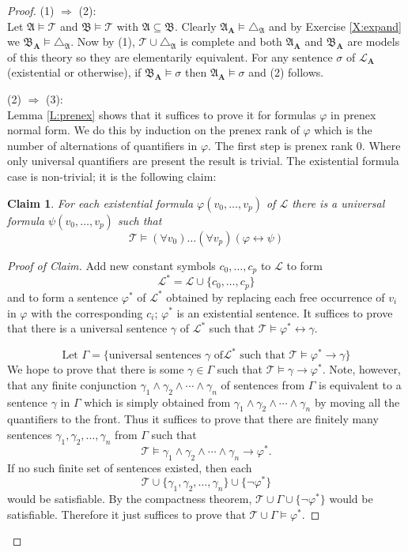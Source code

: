 \documentclass[titlepage, oneside]{amsbook}
\theoremstyle{plain}
\newtheorem*{claim}{Claim}
\theoremstyle{definition}
\theoremstyle{remark}
\newcommand{\tria}[1]{\ensuremath{\triangle_{\mathfrak{#1}}}}
\newcommand{\theory}{\ensuremath{\mathcal{T}}}
\newcommand{\lan}{\ensuremath{\mathcal{L}}}
\newcommand{\seq}{\ensuremath{\subseteq}}
\newcommand{\ma}{\ensuremath{\mathfrak{A}}}
\newcommand{\mb}{\ensuremath{\mathfrak{B}}}
\newcommand{\ba}{\ensuremath{\mathbf{A}}}
\newcommand{\cnot}[2][0]{\ensuremath{ c_{#1} , \dots , c_{#2}}}
\newcommand{\vnot}[2][0]{\ensuremath{ v_{#1} , \dots , v_{#2}}}
\begin{document}
\begin{proof}

(1) $\Rightarrow$ (2): \\
Let $\ma \models \theory$ and $\mb \models \theory$ with $\ma \seq
\mb$.  Clearly $\ma_\ba \models \tria A$ and by Exercise \ref{X:expand} we 
$\mb_\ba \models \tria A$.  Now by (1), $\theory \cup \tria A$ is
complete and both $\ma_\ba $ and $\mb_\ba$ are models of this theory so
they are elementarily equivalent.
For any sentence $\sigma$ of $\lan_\ba$ (existential or
otherwise), if $\mb_\ba \models \sigma$ then $\ma_\ba \models \sigma$
and (2) follows.

(2) $\Rightarrow$ (3): \\
Lemma \ref{L:prenex}  shows that it suffices to prove it for formulas
 $\varphi$ in
prenex normal form.  We do this by induction on the prenex rank of
$\varphi$ which is the number of alternations of quantifiers in
$\varphi$.  The first step is prenex rank $0$.  Where only universal
quantifiers are present the result is trivial.  
The existential formula case is non-trivial; it is the following claim:

\begin{claim}  For each existential formula $\varphi ( \vnot p )$ of
$\lan$ there is a universal formula $\psi (\vnot p )$ such that \[
\theory \models ( \forall v_{0}) \dots ( \forall
v_{p} ) ( \varphi
\leftrightarrow \psi ) \]

\end{claim}

\begin{proof}[Proof of Claim]  Add new constant symbols $\cnot p $ to
$\lan$ to form \[ \lan^{\ast} = \lan \cup \{ \cnot p \} \] and to form
a
sentence $\varphi^{\ast}$ of $\lan^{\ast}$ obtained by replacing each
free occurrence of
$v_i$ in $\varphi$ with the corresponding $c_i$; $\varphi^{\ast}$ is an
existential sentence.  It suffices to prove that there is a universal
sentence $\gamma$ of $\lan^{\ast}$ such that $\theory \models \varphi^{\ast}
\leftrightarrow \gamma$.

\[ \mbox{Let } \Gamma = \{ \mbox{universal sentences } \gamma \mbox{ of
} \lan^{\ast} \mbox{ such that } \theory \models \varphi^{\ast} \to \gamma \}
\]
We hope to prove that there is some $\gamma \in \Gamma $ such that
$\theory \models \gamma \to \varphi^{\ast}$.  Note, however, that any
finite
conjunction $\gamma_1 \wedge \gamma_2 \wedge \cdots \wedge \gamma_n $
of sentences from $\Gamma$ is equivalent to a sentence $\gamma$ in
$\Gamma$ which is simply obtained from $\gamma_1 \wedge \gamma_2 \wedge
\cdots \wedge \gamma_n $ by moving all the quantifiers to the front.
Thus it suffices to prove that there are finitely many sentences
$\gamma_1 , \gamma_2,  \dots , \gamma_n $ from $\Gamma$ such that 
\[ \theory \models \gamma_1 \wedge \gamma_2 \wedge \cdots \wedge
\gamma_n \to \varphi^{\ast}.\]  If no such finite set of sentences
existed,
then each \[ \theory \cup \{ \gamma_1 , \gamma_2 , \dots ,\gamma_n \}
\cup \{ \neg \varphi^{\ast} \} \] would be satisfiable. By the compactness
theorem, $\theory \cup \Gamma \cup \{ \neg \varphi^{\ast} \}$ would be
satisfiable.  Therefore it just suffices to prove that $\theory \cup
\Gamma \models \varphi^{\ast}$.


\end{proof}
\end{proof}
\end{document}
